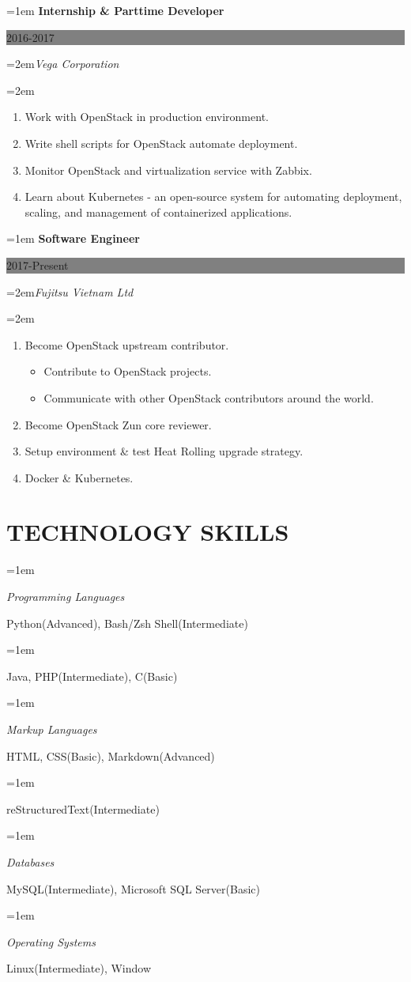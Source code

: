 \documentclass[paper=a4,fontsize=11pt]{scrartcl} %
\newlength{\spacebox}
\newcommand{\sepspace}{\vspace*{1.5em}}		%
\newcommand{\NewPart}[1]{\section*{\uppercase{#1}}}
\newcommand{\PersonalEntry}[2]{
		\noindent\hangindent=1em\hangafter=0 %
		\parbox{\spacebox}{        %
		\large\textit{#1}}		       %
		\hspace{2.5em} \large{#2} \par}    %
\newcommand{\SkillsEntry}[2]{      %
		\noindent\hangindent=1em\hangafter=0 %
		\parbox{\spacebox}{        %
		\large\textit{#1}}			   %
		\hspace{2.5em} \large{#2} \par}    %
\newcommand{\EducationEntry}[4]{
		\noindent\hangindent=1em\hangafter=0 \large\textbf{#1} \hfill      %
		\colorbox{Gray}{%
			\parbox{6.5em}{%
			\hfill\color{White}\large #2}} \par  %
		\noindent\hangindent=2em\hangafter=0\large\textit{#3} \par        %
		\noindent\hangindent=2em\hangafter=0\large{#4} %
		\normalsize \par}
\begin{document}
\sepspace

\EducationEntry{Internship \& Parttime Developer \vspace*{0.3em}}{2016-2017}{Vega Corporation}{
\begin{enumerate}
	\setlength{\itemindent}{+1em}
    \item{Work with OpenStack in production environment.}
    \item{Write shell scripts for OpenStack automate deployment.}
    \item{Monitor OpenStack and virtualization service with Zabbix.}
    \item{Learn about Kubernetes - an open-source system for automating deployment, scaling, and management of containerized applications.}
\end{enumerate}}

\EducationEntry{Software Engineer \vspace*{0.3em}}{2017-Present}{Fujitsu Vietnam Ltd}{
\begin{enumerate}
	\setlength{\itemindent}{+1em}
    \item{Become OpenStack upstream contributor.}
    	\begin{itemize}
    		\item{Contribute to OpenStack projects.}
            \item{Communicate with other OpenStack contributors around the world.}
    	\end{itemize}
    \item{Become OpenStack Zun core reviewer.}
    \item{Setup environment \& test Heat Rolling upgrade strategy.}
    \item{Docker \& Kubernetes.}
\end{enumerate}}
\sepspace

\NewPart{Technology Skills}{}

\SkillsEntry{Programming Languages}
     {Python(Advanced), Bash/Zsh Shell(Intermediate)}
\SkillsEntry{}
     {Java, PHP(Intermediate), C(Basic)}
\sepspace     
  
\SkillsEntry{Markup Languages}
	 {HTML, CSS(Basic), Markdown(Advanced)}
\SkillsEntry{}
	 {reStructuredText(Intermediate)}
\sepspace

\SkillsEntry{Databases}
	 {MySQL(Intermediate), Microsoft SQL Server(Basic)}
\sepspace

\SkillsEntry{Operating Systems}
     {Linux(Intermediate), Window}
\sepspace
\end{document}
